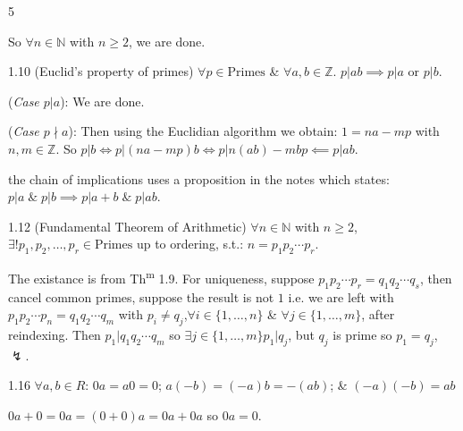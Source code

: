 \documentclass[8pt]{extarticle}
\makeatletter
\renewenvironment{proof}[1][\proofname]{%
  \par%
  \pushQED{\qed}%
  \normalfont
  \topsep=2pt\partopsep=0pt\parsep=0pt\itemsep=0pt%
  \trivlist
  \item[\hskip\labelsep\itshape #1\@addpunct{.}]\ignorespaces
}{%
  \popQED\endtrivlist\@endpefalse
  \vspace{-1pt}%
}
\makeatother
\begin{document}
\begin{multicols}{5}
\begin{proof}
            So \(\forall n\in\mathbb{N}\) with \(n\ge2\), we are done.

        \end{proof}

        \begin{theorem}{1.10}
            (Euclid's property of primes) \(\forall p\in \text{Primes}\) \& \(\forall a,b\in\mathbb{Z}\). \(p|ab\implies p|a\text{ or } p|b\).
        \end{theorem}

        \begin{proof}
            (\textit{Case \(p|a\)}): We are done.

            (\textit{Case \(p\nmid a\)}): Then using the Euclidian algorithm we obtain: \(1=na-mp\) with \(n,m\in\mathbb{Z}\).
            So \(p|b\Longleftrightarrow p|(na-mp)b\Longleftrightarrow p|n(ab)-mbp\impliedby p|ab\).
        \end{proof}

        {\footnotesize the chain of implications uses a proposition in the notes which states: \(p|a\;\&\;p|b\implies p|a+b\;\&\;p|ab\)}.

        \begin{theorem}{1.12}
            (Fundamental Theorem of Arithmetic) \(\forall n\in\mathbb{N}\) with \(n\ge2\), \(\exists! p_1,p_2,\ldots,p_r\in\text{Primes}\) up to ordering, s.t.: \(n=p_1p_2\cdots p_r\).
        \end{theorem}

        \begin{proof}
            The existance is from Th\textsuperscript{m} 1.9. For uniqueness, suppose \(p_1p_2\cdots p_r=q_1q_2\cdots q_s\), then cancel common primes, suppose the result is not \(1\) i.e. we are left with \(p_1p_2\cdots p_n=q_1q_2\cdots q_m\) with \(p_i\ne q_j\),\(\forall i\in\{1,\ldots,n\}\) \& \(\forall j\in\{1,\ldots,m\}\), after reindexing. Then \(p_1|q_1q_2\cdots q_m\) so \(\exists j\in\{1,\ldots,m\}\)\(p_1|q_j\), but \(q_j\) is prime so \(p_1=q_j\), \(\lightning\).
        \end{proof}

        \begin{lemma}{1.16}
            \(\forall a,b\in R\): \(0a=a0=0\); \(a(-b)=(-a)b=-(ab)\); \& \((-a)(-b)=ab\)
        \end{lemma}

        \begin{proof}
            \(0a+0=0a=(0+0)a=0a+0a\) so \(0a=0\).
            

\end{proof}
\end{multicols}
\end{document}
